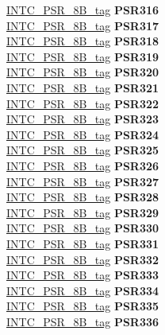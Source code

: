 \begin{DoxyCompactItemize}
\begin{tabbing}
\>\>\mbox{\hyperlink{unionINTC__PSR__8B__tag}{INTC\_PSR\_8B\_tag}} {\bfseries PSR316}\\
\>\>\mbox{\hyperlink{unionINTC__PSR__8B__tag}{INTC\_PSR\_8B\_tag}} {\bfseries PSR317}\\
\>\>\mbox{\hyperlink{unionINTC__PSR__8B__tag}{INTC\_PSR\_8B\_tag}} {\bfseries PSR318}\\
\>\>\mbox{\hyperlink{unionINTC__PSR__8B__tag}{INTC\_PSR\_8B\_tag}} {\bfseries PSR319}\\
\>\>\mbox{\hyperlink{unionINTC__PSR__8B__tag}{INTC\_PSR\_8B\_tag}} {\bfseries PSR320}\\
\>\>\mbox{\hyperlink{unionINTC__PSR__8B__tag}{INTC\_PSR\_8B\_tag}} {\bfseries PSR321}\\
\>\>\mbox{\hyperlink{unionINTC__PSR__8B__tag}{INTC\_PSR\_8B\_tag}} {\bfseries PSR322}\\
\>\>\mbox{\hyperlink{unionINTC__PSR__8B__tag}{INTC\_PSR\_8B\_tag}} {\bfseries PSR323}\\
\>\>\mbox{\hyperlink{unionINTC__PSR__8B__tag}{INTC\_PSR\_8B\_tag}} {\bfseries PSR324}\\
\>\>\mbox{\hyperlink{unionINTC__PSR__8B__tag}{INTC\_PSR\_8B\_tag}} {\bfseries PSR325}\\
\>\>\mbox{\hyperlink{unionINTC__PSR__8B__tag}{INTC\_PSR\_8B\_tag}} {\bfseries PSR326}\\
\>\>\mbox{\hyperlink{unionINTC__PSR__8B__tag}{INTC\_PSR\_8B\_tag}} {\bfseries PSR327}\\
\>\>\mbox{\hyperlink{unionINTC__PSR__8B__tag}{INTC\_PSR\_8B\_tag}} {\bfseries PSR328}\\
\>\>\mbox{\hyperlink{unionINTC__PSR__8B__tag}{INTC\_PSR\_8B\_tag}} {\bfseries PSR329}\\
\>\>\mbox{\hyperlink{unionINTC__PSR__8B__tag}{INTC\_PSR\_8B\_tag}} {\bfseries PSR330}\\
\>\>\mbox{\hyperlink{unionINTC__PSR__8B__tag}{INTC\_PSR\_8B\_tag}} {\bfseries PSR331}\\
\>\>\mbox{\hyperlink{unionINTC__PSR__8B__tag}{INTC\_PSR\_8B\_tag}} {\bfseries PSR332}\\
\>\>\mbox{\hyperlink{unionINTC__PSR__8B__tag}{INTC\_PSR\_8B\_tag}} {\bfseries PSR333}\\
\>\>\mbox{\hyperlink{unionINTC__PSR__8B__tag}{INTC\_PSR\_8B\_tag}} {\bfseries PSR334}\\
\>\>\mbox{\hyperlink{unionINTC__PSR__8B__tag}{INTC\_PSR\_8B\_tag}} {\bfseries PSR335}\\
\>\>\mbox{\hyperlink{unionINTC__PSR__8B__tag}{INTC\_PSR\_8B\_tag}} {\bfseries PSR336}\\

\end{tabbing}
\end{DoxyCompactItemize}
